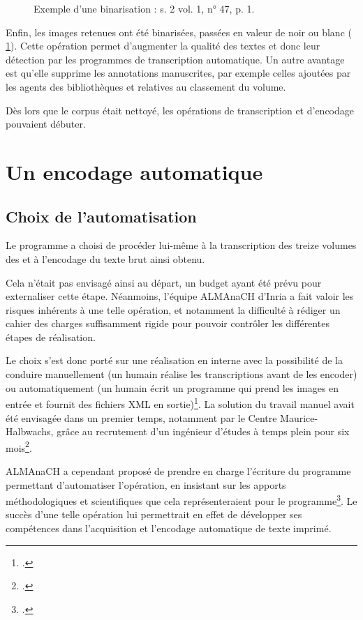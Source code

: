 \begin{figure}[h]
\begin{subfigure}[t]{0.4\textwidth}
    \end{subfigure}
    \caption{Exemple d'une binarisation : s. 2 vol. 1, n° 47, p. 1.}
    \label{fig:binarisation}
\end{figure}

Enfin, les images retenues ont été binarisées, \cad{} passées en valeur de noir ou blanc (\fig{} \ref{fig:binarisation}). Cette opération permet d'augmenter la qualité des textes et donc leur détection par les programmes de transcription automatique. Un autre avantage est qu'elle supprime les annotations manuscrites, par exemple celles ajoutées par les agents des bibliothèques et relatives au classement du volume.

Dès lors que le corpus était nettoyé, les opérations de transcription et d'encodage pouvaient débuter.

\chapter{Un encodage automatique}

\section{Choix de l'automatisation}
Le programme \timeus{} a choisi de procéder lui-même à la transcription des treize volumes des \odm{} et à l'encodage du texte brut ainsi obtenu. 

Cela n'était pas envisagé ainsi au départ, un budget ayant été prévu pour externaliser cette étape. Néanmoins, l'équipe ALMAnaCH d'Inria a fait valoir les risques inhérents à une telle opération, et notamment la difficulté à rédiger un cahier des charges suffisamment rigide pour pouvoir contrôler les différentes étapes de réalisation.

Le choix s'est donc porté sur une réalisation en interne avec la possibilité de la conduire manuellement (un humain réalise les transcriptions avant de les encoder) ou automatiquement (un humain écrit un programme qui prend les images en entrée et fournit des fichiers XML en sortie)\footcite[p. 52]{chague}. La solution du travail manuel avait été envisagée dans un premier temps, notamment par le Centre Maurice-Halbwachs, grâce au recrutement d'un ingénieur d'études à temps plein pour six mois\footcite[p. 52]{chague}. 

ALMAnaCH a cependant proposé de prendre en charge l'écriture du programme permettant d'automatiser l'opération, en insistant sur les apports méthodologiques et scientifiques que cela représenteraient pour le programme\footcite[p. 52]{chague}. Le succès d'une telle opération lui permettrait en effet de développer ses compétences dans l'acquisition et l'encodage automatique de texte imprimé.

